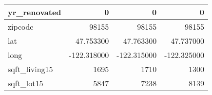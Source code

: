 \begin{table}[H]
\begin{tabular}{|l|r|r|r|}
\hline yr\_renovated & \cellcolor[rgb]{0.9, 0.54, 0.52} 0 & \cellcolor[rgb]{0.9, 0.54, 0.52} 0 & \cellcolor[rgb]{0.9, 0.54, 0.52} 0 \\
\hline zipcode & \cellcolor[rgb]{0.9, 0.54, 0.52} 98155 & \cellcolor[rgb]{0.9, 0.54, 0.52} 98155 & \cellcolor[rgb]{0.9, 0.54, 0.52} 98155 \\
\hline lat & \cellcolor[rgb]{0.9, 0.54, 0.52} 47.753300 & 47.763300 & 47.737000 \\
\hline long & \cellcolor[rgb]{0.9, 0.54, 0.52} -122.318000 & \cellcolor[rgb]{0.9, 0.54, 0.52} -122.315000 & \cellcolor[rgb]{0.9, 0.54, 0.52} -122.325000 \\
\hline sqft\_living15 & \cellcolor[rgb]{0.9, 0.54, 0.52} 1695 & 1710 & 1300 \\
\hline sqft\_lot15 & \cellcolor[rgb]{0.9, 0.54, 0.52} 5847 & 7238 & 8139 \\
\hline
\end{tabular}
\end{table}
